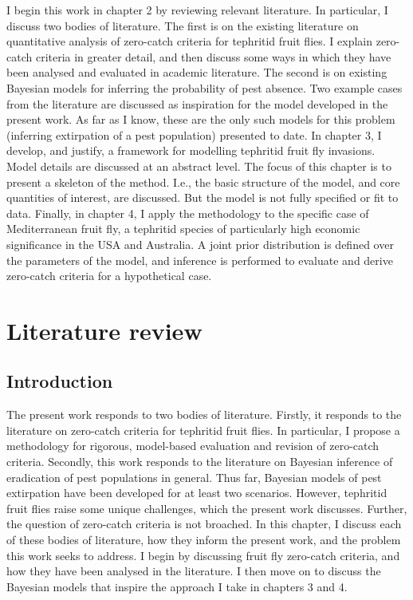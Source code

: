 \documentclass[
  oneside]{book}
\begin{document}
I begin this work in chapter 2 by reviewing relevant literature. In particular, I discuss two bodies of literature. The first is on the existing literature on quantitative analysis of zero-catch criteria for tephritid fruit flies. I explain zero-catch criteria in greater detail, and then discuss some ways in which they have been analysed and evaluated in academic literature. The second is on existing Bayesian models for inferring the probability of pest absence. Two example cases from the literature are discussed as inspiration for the model developed in the present work. As far as I know, these are the only such models for this problem (inferring extirpation of a pest population) presented to date. In chapter 3, I develop, and justify, a framework for modelling tephritid fruit fly invasions. Model details are discussed at an abstract level. The focus of this chapter is to present a skeleton of the method. I.e., the basic structure of the model, and core quantities of interest, are discussed. But the model is not fully specified or fit to data. Finally, in chapter 4, I apply the methodology to the specific case of Mediterranean fruit fly, a tephritid species of particularly high economic significance in the USA and Australia. A joint prior distribution is defined over the parameters of the model, and inference is performed to evaluate and derive zero-catch criteria for a hypothetical case.

\hypertarget{lit-review}{%
\chapter{Literature review}\label{lit-review}}

\hypertarget{introduction-1}{%
\section{Introduction}\label{introduction-1}}

The present work responds to two bodies of literature. Firstly, it responds to the literature on zero-catch criteria for tephritid fruit flies. In particular, I propose a methodology for rigorous, model-based evaluation and revision of zero-catch criteria. Secondly, this work responds to the literature on Bayesian inference of eradication of pest populations in general. Thus far, Bayesian models of pest extirpation have been developed for at least two scenarios. However, tephritid fruit flies raise some unique challenges, which the present work discusses. Further, the question of zero-catch criteria is not broached. In this chapter, I discuss each of these bodies of literature, how they inform the present work, and the problem this work seeks to address. I begin by discussing fruit fly zero-catch criteria, and how they have been analysed in the literature. I then move on to discuss the Bayesian models that inspire the approach I take in chapters 3 and 4.
\end{document}
